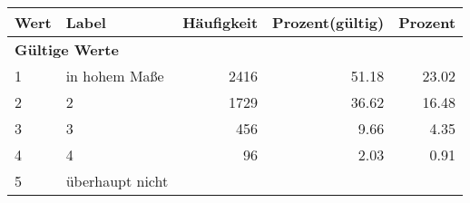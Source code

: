      \begin{longtable}{lXrrr}
     \toprule
     \textbf{Wert} & \textbf{Label} & \textbf{Häufigkeit} & \textbf{Prozent(gültig)} & \textbf{Prozent} \\
     \endhead
     \midrule
     \multicolumn{5}{l}{\textbf{Gültige Werte}}\\

     1 &
     \multicolumn{1}{X}{ in hohem Maße   } &


       \num{2416} &
       \num[round-mode=places,round-precision=2]{51,18} &
         \num[round-mode=places,round-precision=2]{23,02} \\

     2 &
     \multicolumn{1}{X}{ 2   } &


       \num{1729} &
       \num[round-mode=places,round-precision=2]{36,62} &
         \num[round-mode=places,round-precision=2]{16,48} \\

     3 &
     \multicolumn{1}{X}{ 3   } &


       \num{456} &
       \num[round-mode=places,round-precision=2]{9,66} &
         \num[round-mode=places,round-precision=2]{4,35} \\

     4 &
     \multicolumn{1}{X}{ 4   } &


       \num{96} &
       \num[round-mode=places,round-precision=2]{2,03} &
         \num[round-mode=places,round-precision=2]{0,91} \\

     5 &
     \multicolumn{1}{X}{ überhaupt nicht   } &



\end{longtable}
